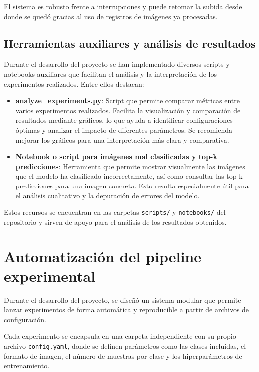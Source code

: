 \documentclass[12pt,a4paper]{article}
\begin{document}
El sistema es robusto frente a interrupciones y puede retomar la subida desde donde se quedó gracias al uso de registros de imágenes ya procesadas.

\subsection{Herramientas auxiliares y análisis de resultados}

Durante el desarrollo del proyecto se han implementado diversos scripts y notebooks auxiliares que facilitan el análisis y la interpretación de los experimentos realizados. Entre ellos destacan:

\begin{itemize}
    \item \textbf{analyze\_experiments.py}: Script que permite comparar métricas entre varios experimentos realizados. Facilita la visualización y comparación de resultados mediante gráficos, lo que ayuda a identificar configuraciones óptimas y analizar el impacto de diferentes parámetros. Se recomienda mejorar los gráficos para una interpretación más clara y comparativa.
    \item \textbf{Notebook o script para imágenes mal clasificadas y top-k predicciones}: Herramienta que permite mostrar visualmente las imágenes que el modelo ha clasificado incorrectamente, así como consultar las top-k predicciones para una imagen concreta. Esto resulta especialmente útil para el análisis cualitativo y la depuración de errores del modelo.
\end{itemize}

Estos recursos se encuentran en las carpetas \texttt{scripts/} y \texttt{notebooks/} del repositorio y sirven de apoyo para el análisis de los resultados obtenidos.


\section{Automatización del pipeline experimental}

Durante el desarrollo del proyecto, se diseñó un sistema modular que permite lanzar experimentos de forma automática y reproducible a partir de archivos de configuración.

Cada experimento se encapsula en una carpeta independiente con su propio archivo \texttt{config.yaml}, donde se definen parámetros como las clases incluidas, el formato de imagen, el número de muestras por clase y los hiperparámetros de entrenamiento.
\end{document}
